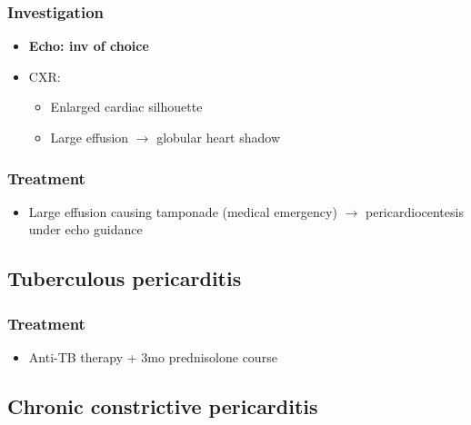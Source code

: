 \documentclass[
  12pt,
]{memoir}
\providecommand{\tightlist}{%
  \setlength{\itemsep}{0pt}\setlength{\parskip}{0pt}}
\begin{document}
\hypertarget{investigation-20}{%
\subsubsection{Investigation}\label{investigation-20}}

\begin{itemize}
\tightlist
\item
  \textbf{Echo: inv of choice}
\item
  CXR:

  \begin{itemize}
  \tightlist
  \item
    Enlarged cardiac silhouette
  \item
    Large effusion \(\rightarrow\) globular heart shadow
  \end{itemize}
\end{itemize}

\hypertarget{treatment-10}{%
\subsubsection{Treatment}\label{treatment-10}}

\begin{itemize}
\tightlist
\item
  Large effusion causing tamponade (medical emergency) \(\rightarrow\)
  pericardiocentesis under echo guidance
\end{itemize}

\hypertarget{tuberculous-pericarditis}{%
\subsection{Tuberculous pericarditis}\label{tuberculous-pericarditis}}

\hypertarget{treatment-11}{%
\subsubsection{Treatment}\label{treatment-11}}

\begin{itemize}
\tightlist
\item
  Anti-TB therapy + 3mo prednisolone course
\end{itemize}

\hypertarget{chronic-constrictive-pericarditis}{%
\subsection{Chronic constrictive
pericarditis}\label{chronic-constrictive-pericarditis}}
\end{document}
